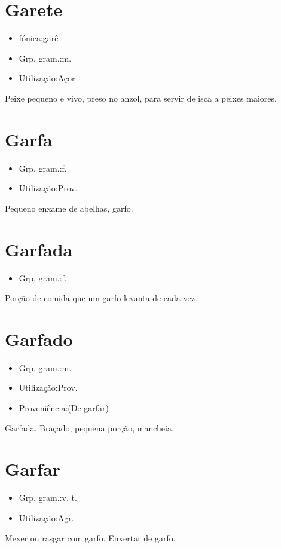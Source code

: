 \section{Garete}
\begin{itemize}
\item {fónica:garê}
\end{itemize}
\begin{itemize}
\item {Grp. gram.:m.}
\end{itemize}
\begin{itemize}
\item {Utilização:Açor}
\end{itemize}
Peixe pequeno e vivo, preso no anzol, para servir de isca a peixes maiores.
\section{Garfa}
\begin{itemize}
\item {Grp. gram.:f.}
\end{itemize}
\begin{itemize}
\item {Utilização:Prov.}
\end{itemize}
Pequeno enxame de abelhas, garfo.
\section{Garfada}
\begin{itemize}
\item {Grp. gram.:f.}
\end{itemize}
Porção de comida que um garfo levanta de cada vez.
\section{Garfado}
\begin{itemize}
\item {Grp. gram.:m.}
\end{itemize}
\begin{itemize}
\item {Utilização:Prov.}
\end{itemize}
\begin{itemize}
\item {Proveniência:(De \textunderscore garfar\textunderscore )}
\end{itemize}
Garfada.
Braçado, pequena porção, mancheia.
\section{Garfar}
\begin{itemize}
\item {Grp. gram.:v. t.}
\end{itemize}
\begin{itemize}
\item {Utilização:Agr.}
\end{itemize}
Mexer ou rasgar com garfo.
Enxertar de garfo.
